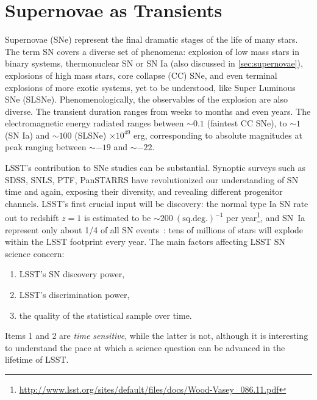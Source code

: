 %
%
%

\section{Supernovae as Transients}
\def\secname{\chpname:SNtransients}\label{sec:\secname}


Supernovae (SNe) represent the final dramatic stages of the life of many
stars. The term SN covers a diverse set of phenomena: explosion of
low mass stars in binary systems, thermonuclear SN or SN Ia (also
discussed in \autoref{sec:supernovae}), explosions of high mass stars,
core collapse (CC) SNe, and even terminal explosions of more exotic
systems, yet to be understood, like Super Luminous SNe
(SLSNe). Phenomenologically, the observables of the explosion are
also diverse. The transient duration ranges from weeks to
months and even years. The electromagnetic energy radiated ranges between
$\sim0.1$ (faintest CC SNe), to $\sim1$ (SN Ia) and $\sim100$ (SLSNe)
$\times 10^{49}$ erg, corresponding to absolute magnitudes at peak
ranging between $\sim-19$ and $\sim-22$.

LSST's contribution to SNe studies can be substantial. Synoptic
surveys such as SDSS, SNLS, PTF, PanSTARRS have revolutionized our
understanding of SN time and again, exposing their diversity,
and revealing different progenitor channels. LSST's first crucial
input will be discovery: the normal type Ia SN rate out to redshift
$z=1$ is estimated to be $\sim200 ~(\mathrm{sq. deg.})^{-1}$ per
year\footnote{\url{http://www.lsst.org/sites/default/files/docs/Wood-Vasey_086.11.pdf}},
and SN~Ia represent only about 1/4 of all SN
events~\citep{Li11b}: tens of millions of stars will explode
within the LSST footprint every year. The main factors affecting
LSST SN science concern:
\begin{enumerate}
\item
LSST's SN discovery power,
\item
LSST's discrimination power,
\item
the quality of the statistical sample over time.
\end{enumerate}
Items 1 and 2 are \emph{time sensitive}, while the latter
is not, although it is interesting to understand the pace at which a
science question can be advanced in the lifetime of LSST.

